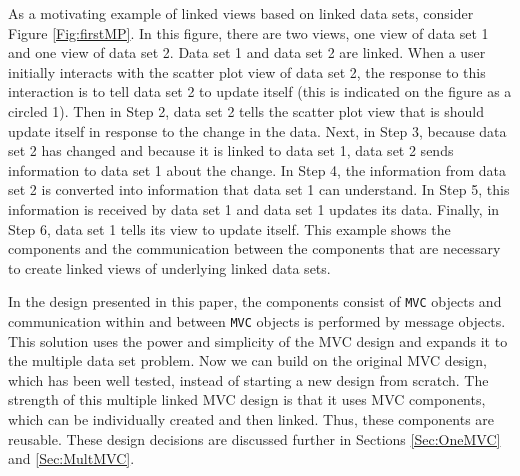 \documentclass{article}[11pt]
\newcommand{\Robject}[1]{{\texttt{#1}}}
\begin{document}
As a motivating example of linked views based on linked data sets, consider
Figure \ref{Fig:firstMP}.  In this figure, there are two views, one view of
data set 1 and one view of data set 2.  Data set 1 and data set 2 are linked.
When a user initially interacts with the scatter plot view of data set 2, the
response to this interaction is to tell data set 2 to update itself (this is
indicated on the figure as a circled 1).  Then in Step 2, data set 2 tells the
scatter plot view that is should update itself in response to the change in the
data.  Next, in Step 3, because data set 2 has changed and because it is
linked to data set 1, data set 2 sends information to data set 1 about the
change.  In Step 4, the information from data set 2 is converted into
information that data set 1 can understand.  In Step 5, this information is
received by data set 1 and data set 1 updates its data.  Finally, in Step 6,
data set 1 tells its view to update itself.  This example shows the components
and the communication between the components that are necessary to create
linked views of underlying linked data sets.  

In the design presented in this paper, the components consist of \Robject{MVC}
objects and communication within and between \Robject{MVC} objects is
performed by message objects.  This solution uses the power and simplicity of
the MVC design and expands it to the multiple data set problem.  Now we can
build on the original MVC design, which has been well tested, instead of
starting a new design from scratch.  The strength of this multiple linked MVC
design is that it uses MVC components, which can be individually created and
then linked.  Thus, these components are reusable.  These design decisions are
discussed further in Sections \ref{Sec:OneMVC} and \ref{Sec:MultMVC}. 

\end{document}
